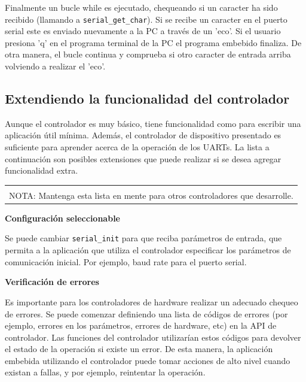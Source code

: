 \documentclass[output=paper, 
colorlinks,
citecolor=brown,
newtxmath
]{langscibook}
\begin{document}
Finalmente un bucle while es ejecutado, chequeando si un caracter
ha sido recibido (llamando a \texttt{serial\_get\_char}). Si se recibe un caracter
en el puerto serial este es enviado nuevamente a la PC a través de un 'eco'.
Si el usuario presiona 'q' en el programa terminal de la PC el programa
embebido finaliza. De otra manera, el bucle continua y comprueba si otro
caracter de entrada arriba volviendo a realizar el 'eco'.


\subsection {Extendiendo la funcionalidad del controlador}


Aunque el controlador es muy básico, tiene funcionalidad como para
escribir una aplicación útil mínima.
Además, el controlador de dispositivo 
presentado es suficiente para aprender acerca de la operación de los UARTs.
La lista a continuación son posibles extensiones que puede realizar
si se desea agregar funcionalidad extra.

\begin{center}
\begin{tabularx}{\textwidth}{|X|}
\hline
\rowcolor{aliceblue}
\textbf{}\\
NOTA: Mantenga esta lista en mente para otros controladores que desarrolle.\\
\hline
\end{tabularx}
\end{center}



\textbf{Configuración seleccionable}

Se puede cambiar \texttt{serial\_init} para que reciba parámetros de entrada,
que permita a la aplicación que utiliza el controlador especificar
los parámetros de comunicación inicial. Por ejemplo, baud rate para
el puerto serial.

\textbf{Verificación de errores}

Es importante para los controladores de hardware realizar un adecuado
chequeo de errores. Se puede comenzar definiendo una lista de códigos
de errores (por ejemplo, errores en los parámetros, errores de hardware, etc)
en la API de controlador.
Las funciones del controlador utilizarían estos códigos para devolver
el estado de la operación si existe un error. De esta manera, la aplicación embebida
utilizando el controlador puede tomar acciones de alto nivel cuando existan
a fallas, y por ejemplo, reintentar la operación.
\end{document}
